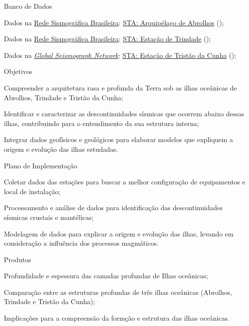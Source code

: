 \documentclass[10pt,a4paper,oneside]{book}
\begin{document}
\begin{fancyenum}{\faDatabase}{Banco de Dados}
	\item Dados na \href{http://rsbr.on.br/}{Rede Sismográfica Brasileira}: \href{http://rsbr.on.br:8080/rsbr_map_net_station_1/estacoes/estacao_descricao.jsp?id_network=14614&id_station=15102&network=ON&station=ABR01&latitude=-17.9646&longitude=-38.6959&elevation=38}{STA: Arquipélago de Abrolhos} (\faUnlock);
	\item Dados na \href{http://rsbr.on.br/}{Rede Sismográfica Brasileira}: \href{http://rsbr.on.br:8080/rsbr_map_net_station_1/estacoes/estacao_descricao.jsp?id_network=14614&id_station=15270&network=ON&station=TRI01&latitude=-20.5076&longitude=-29.3146&elevation=26}{STA: Estação de Trindade} (\faUnlock);
	\item Dados na \href{http://www.fdsn.org/networks/detail/IU/}{\textit{Global Seismograph Network}}: \href{https://ds.iris.edu/mda/IU/TRIS/}{STA: Estação de Tristão da Cunha} (\faUnlock);
\end{fancyenum}

\begin{fancyenum}{\faFutbol}{Objetivos}
	\item Compreender a arquitetura rasa e profunda da Terra sob as ilhas oceânicas de Abrolhos, Trindade e Tristão da Cunha;
	\item Identificar e caracterizar as descontinuidades sísmicas que ocorrem abaixo dessas ilhas, contribuindo para o entendimento da sua estrutura interna;
	\item Integrar dados geofísicos e geológicos para elaborar modelos que expliquem a origem e evolução das ilhas estudadas.
\end{fancyenum}

\begin{fancyenum}{\faBrain}{Plano de Implementação}
	\item Coletar dados das estações para buscar a melhor configuração de equipamentos e local de instalação;
	\item Processamento e análise de dados para identificação das descontinuidades sísmicas crustais e mantélicas;
	\item Modelagem de dados para explicar a origem e evolução das ilhas, levando em consideração a influência dos processos magmáticos.
\end{fancyenum}

\begin{fancyenum}{\faShoppingCart}{Produtos}
	\item Profundidade e espessura das camadas profundas de Ilhas oceânicas;
	\item Comparação entre as estruturas profundas de três ilhas oceânicas (Abrolhos, Trindade e Tristão da Cunha);	
	\item Implicações para a compreensão da formção e estrutura das ilhas oceânicas.
\end{fancyenum}
\end{document}
